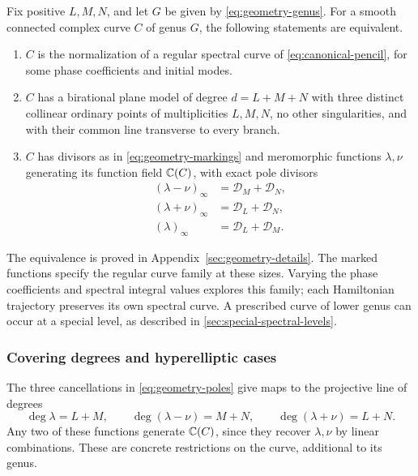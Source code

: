 \begin{theorem}\label{thm:geometry-classification}
Fix positive $L,M,N$, and let $G$ be given by
\cref{eq:geometry-genus}. For a smooth connected complex curve $C$
of genus $G$, the following statements are equivalent.
\begin{enumerate}
 \item $C$ is the normalization of a regular spectral curve of
 \cref{eq:canonical-pencil}, for some phase coefficients and initial modes.
 \item $C$ has a birational plane model of degree $d=L+M+N$
 with three distinct collinear ordinary points of multiplicities
 $L,M,N$, no other singularities, and with their common line
 transverse to every branch.
 \item $C$ has divisors as in \cref{eq:geometry-markings} and
 meromorphic functions $\lambda,\nu$ generating its function field
 $\mathbb C(C)$, with exact pole divisors
 \begin{equation}\label{eq:geometry-poles}
 \begin{aligned}
  (\lambda-\nu)_\infty&=\mathcal D_M+\mathcal D_N,\\
  (\lambda+\nu)_\infty&=\mathcal D_L+\mathcal D_N,\\
  (\lambda)_\infty&=\mathcal D_L+\mathcal D_M.
 \end{aligned}
 \end{equation}
\end{enumerate}
\end{theorem}
The equivalence is proved in Appendix~\ref{sec:geometry-details}.
The marked functions specify the regular curve family at these sizes.
Varying the phase coefficients and spectral integral values explores
this family; each Hamiltonian trajectory preserves its own spectral
curve. A prescribed curve of lower genus can occur at a special level,
as described in \cref{sec:special-spectral-levels}.

\subsubsection{Covering degrees and hyperelliptic cases}

The three cancellations in \cref{eq:geometry-poles} give maps to
the projective line of degrees
\begin{equation}\label{eq:geometry-degrees}
 \deg\lambda=L+M,\qquad
 \deg(\lambda-\nu)=M+N,\qquad
 \deg(\lambda+\nu)=L+N.
\end{equation}
Any two of these functions generate $\mathbb C(C)$, since they recover
$\lambda,\nu$ by linear combinations. These are concrete
restrictions on the curve, additional to its genus.

